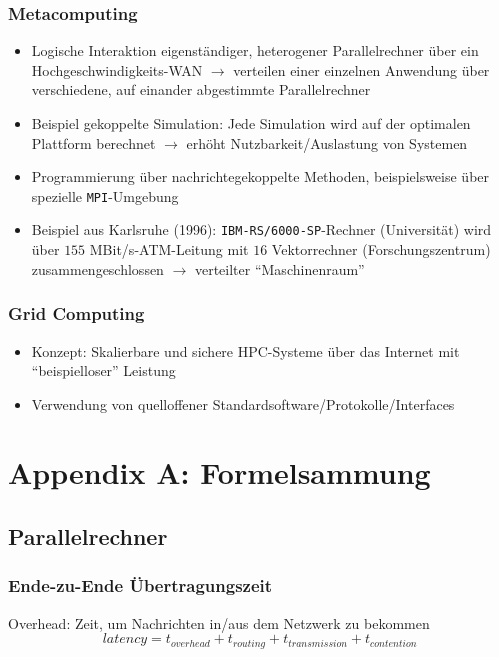 \subsubsection{Metacomputing}
\begin{itemize}
	\item Logische Interaktion eigenständiger, heterogener Parallelrechner über ein Hochgeschwindigkeits-WAN \(\rightarrow\) verteilen einer einzelnen Anwendung über verschiedene, auf einander abgestimmte Parallelrechner
	\item Beispiel gekoppelte Simulation: Jede Simulation wird auf der optimalen Plattform berechnet \(\rightarrow\) erhöht Nutzbarkeit/Auslastung von Systemen
	\item Programmierung über nachrichtegekoppelte Methoden, beispielsweise über spezielle \texttt{MPI}-Umgebung
	\item Beispiel aus Karlsruhe (1996): \texttt{IBM-RS/6000-SP}-Rechner (Universität) wird über \(155\) MBit/s-ATM-Leitung mit \(16\) Vektorrechner (Forschungszentrum) zusammengeschlossen \(\rightarrow\) verteilter "`Maschinenraum"'
\end{itemize}


\subsubsection{Grid Computing}
\begin{itemize}
	\item Konzept: Skalierbare und sichere HPC-Systeme über das Internet mit "`beispielloser"' Leistung
	\item Verwendung von quelloffener Standardsoftware/Protokolle/Interfaces
\end{itemize}



\newpage
\section{Appendix A: Formelsammung}

\subsection{Parallelrechner}

\subsubsection{Ende-zu-Ende Übertragungszeit}
Overhead: Zeit, um Nachrichten in/aus dem Netzwerk zu bekommen
\begin{equation}
	latency = t_{overhead} + t_{routing} + t_{transmission} + t_{contention}
\end{equation}


